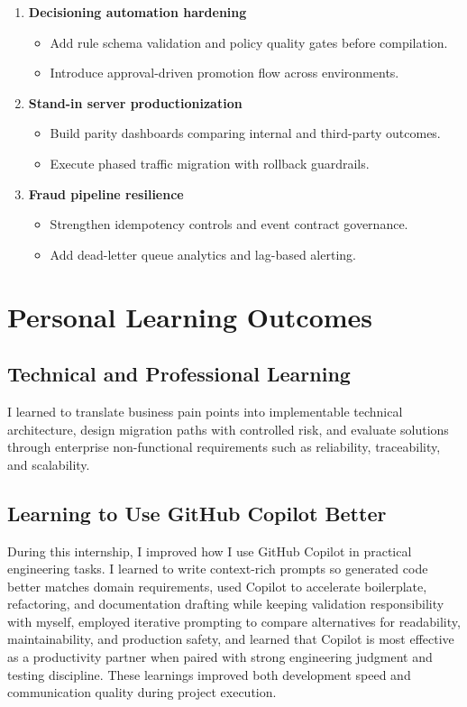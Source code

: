 \begin{enumerate}
	\item \textbf{Decisioning automation hardening}
	\begin{itemize}
		\item Add rule schema validation and policy quality gates before compilation.
		\item Introduce approval-driven promotion flow across environments.
	\end{itemize}

	\item \textbf{Stand-in server productionization}
	\begin{itemize}
		\item Build parity dashboards comparing internal and third-party outcomes.
		\item Execute phased traffic migration with rollback guardrails.
	\end{itemize}

	\item \textbf{Fraud pipeline resilience}
	\begin{itemize}
		\item Strengthen idempotency controls and event contract governance.
		\item Add dead-letter queue analytics and lag-based alerting.
	\end{itemize}
\end{enumerate}

\section{Personal Learning Outcomes}

\subsection{Technical and Professional Learning}

I learned to translate business pain points into implementable technical architecture, design migration paths with controlled risk, and evaluate solutions through enterprise non-functional requirements such as reliability, traceability, and scalability.

\subsection{Learning to Use GitHub Copilot Better}

During this internship, I improved how I use GitHub Copilot in practical engineering tasks. I learned to write context-rich prompts so generated code better matches domain requirements, used Copilot to accelerate boilerplate, refactoring, and documentation drafting while keeping validation responsibility with myself, employed iterative prompting to compare alternatives for readability, maintainability, and production safety, and learned that Copilot is most effective as a productivity partner when paired with strong engineering judgment and testing discipline. These learnings improved both development speed and communication quality during project execution.